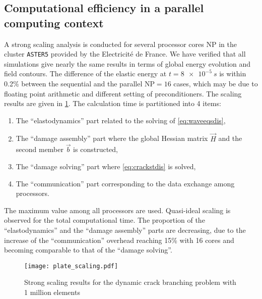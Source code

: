 \subsection{Computational efficiency in a parallel computing context}
A strong scaling analysis is conducted for several processor cores $\mathrm{NP}$ in the cluster \texttt{ASTER5} provided by the Electricité de France. We have verified that all simulations give nearly the same results in terms of global energy evolution and field contours. The difference of the elastic energy at $t=\SI{8e-5}{s}$ is within 0.2\% between the sequential and the parallel $\mathrm{NP}=16$ cases, which may be due to floating point arithmetic and different setting of preconditioners. The scaling results are given in \cref{fig:scaling}. The calculation time is partitioned into 4 items:
\begin{enumerate}
\item The ``elastodynamics'' part related to the solving of \eqref{eq:waveeqsdis},
\item The ``damage assembly'' part where the global Hessian matrix $\vec{H}$ and the second member $\vec{b}$ is constructed,
\item The ``damage solving'' part where \eqref{eq:crackstdis} is solved,
\item The ``communication'' part corresponding to the data exchange among processors.
\end{enumerate}
The maximum value among all processors are used. Quasi-ideal scaling is observed for the total computational time. The proportion of the ``elastodynamics'' and the ``damage assembly'' parts are decreasing, due to the increase of the ``communication'' overhead reaching 15\% with 16 cores and becoming comparable to that of the ``damage solving''.
\begin{figure}[htbp]
\centering
\texttt{[image: plate\_scaling.pdf]}
\caption{Strong scaling results for the dynamic crack branching problem with 1 million elements} \label{fig:scaling}
\end{figure}

